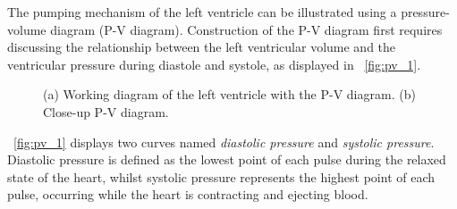 The pumping mechanism of the left ventricle can be illustrated using a pressure-volume diagram (P-V diagram). Construction of the P-V diagram first requires discussing the relationship between the left ventricular volume and the ventricular pressure during diastole and systole, as displayed in \figurename~\ref{fig:pv_1}.
\begin{figure}[h]
  \centering
  \caption[P-V diagram \cite{GH20}]{(a) Working diagram of the left ventricle with the P-V diagram. (b) Close-up P-V diagram. \cite{GH20}}
  \label{fig:pv}
\end{figure}
\figurename~\ref{fig:pv_1} displays two curves named \textit{diastolic pressure} and \textit{systolic pressure}. Diastolic pressure is defined as the lowest point of each pulse during the relaxed state of the heart, whilst systolic pressure represents the highest point of each pulse, occurring while the heart is contracting and ejecting blood. \cite{HKS4}
